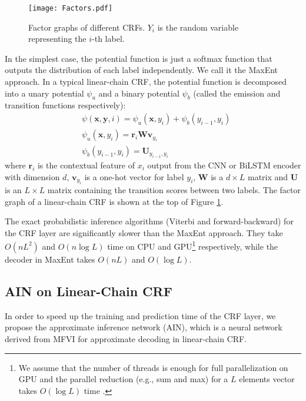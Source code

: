 \documentclass[11pt,a4paper]{article}
\newcommand{\xvec}{\mathbf{x}}
\newcommand{\yvec}{\mathbf{y}}
\newcommand{\vvec}{\mathbf{v}}
\newcommand{\Wvec}{\mathbf{W}}
\newcommand{\Uvec}{\mathbf{U}}
\newcommand{\rvec}{\mathbf{r}}
\begin{document}
\begin{figure}[t]
\centering
\texttt{[image: Factors.pdf]}
\caption{Factor graphs of different CRFs. $Y_i$ is the random variable representing the $i$-th label.}
\label{fig:crf_structure}
\end{figure}


In the simplest case, the potential function is just a softmax function that outputs the distribution of each label independently. We call it the MaxEnt approach. In a typical linear-chain CRF, the potential function is decomposed into a unary potential $\psi_u$ and a binary potential $\psi_b$ (called the emission and transition functions respectively):
\begin{align}
&\psi(\xvec, \yvec, i) = \psi_u(\xvec, y_i) + \psi_b(y_{i-1}, y_i) \label{eq:crf_potential} \\
&\psi_u(\xvec, y_i) = \rvec_i\Wvec \vvec_{y_i} \nonumber\\
&\psi_b(y_{i-1}, y_i) = \Uvec_{y_{i-1},y_i} \label{eq:binary}
\end{align}
where $\rvec_i$ is the contextual feature of $x_i$ output from the CNN or BiLSTM encoder with dimension $d$, $\vvec_{y_i}$ is a one-hot vector for label $y_i$, $\Wvec$ is a $d \times L$ matrix and $\Uvec$ is an $L \times L$ matrix containing the transition scores between two labels. The factor graph of a linear-chain CRF is shown at the top of Figure \ref{fig:crf_structure}.

The exact probabilistic inference algorithms (Viterbi and forward-backward)
for the CRF layer are significantly slower than the MaxEnt approach. They take $O(nL^2)$ and $O(n\log L)$ time on CPU and GPU\footnote{We assume that the number of threads is enough for full parallelization on GPU and the parallel reduction (e.g., sum and max) for a $L$ elements vector takes $O(\log L)$ time \cite{harris2007optimizing}.} respectively, while the decoder in MaxEnt takes $O(nL)$ and $O(\log L)$. 



\subsection{AIN on Linear-Chain CRF}
\label{sec:first-order}
In order to speed up the training and prediction time of the CRF layer, we propose the approximate inference network (AIN), which is a neural network derived from MFVI for approximate decoding in linear-chain CRF.
\end{document}
